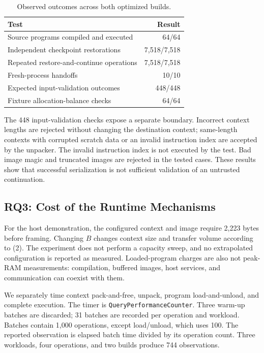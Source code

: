 \documentclass[conference,letterpaper]{IEEEtran}
\newcommand{\code}[1]{\texttt{#1}}
\begin{document}
\begin{table}[t]
\caption{Observed outcomes across both optimized builds.}
\label{tab:continuity}
\centering\footnotesize
\begin{tabular}{@{}lr@{}}
\toprule
Test & Result \\
\midrule
Source programs compiled and executed & 64/64 \\
Independent checkpoint restorations & 7,518/7,518 \\
Repeated restore-and-continue operations & 7,518/7,518 \\
Fresh-process handoffs & 10/10 \\
Expected input-validation outcomes & 448/448 \\
Fixture allocation-balance checks & 64/64 \\
\bottomrule
\end{tabular}
\end{table}

The 448 input-validation checks expose a separate boundary. Incorrect context lengths are rejected without changing the destination context; same-length contexts with corrupted scratch data or an invalid instruction index are accepted by the unpacker. The invalid instruction index is not executed by the test. Bad image magic and truncated images are rejected in the tested cases. These results show that successful serialization is not sufficient validation of an untrusted continuation.

\subsection{RQ3: Cost of the Runtime Mechanisms}
For the host demonstration, the configured context and image require 2,223 bytes before framing. Changing $B$ changes context size and transfer volume according to (2). The experiment does not perform a capacity sweep, and no extrapolated configuration is reported as measured. Loaded-program charges are also not peak-RAM measurements: compilation, buffered images, host services, and communication can coexist with them.

We separately time context pack-and-free, unpack, program load-and-unload, and complete execution. The timer is \code{QueryPerformanceCounter}. Three warm-up batches are discarded; 31 batches are recorded per operation and workload. Batches contain 1,000 operations, except load/unload, which uses 100. The reported observation is elapsed batch time divided by its operation count. Three workloads, four operations, and two builds produce 744 observations.
\end{document}
